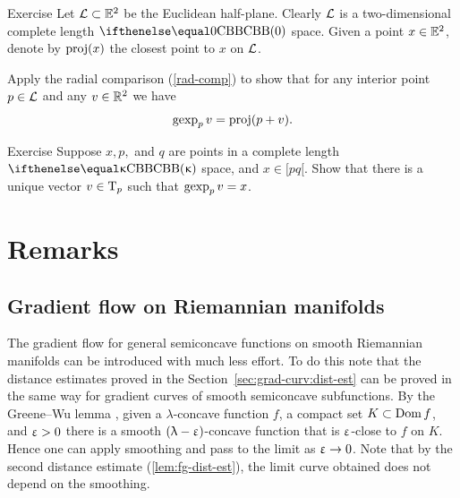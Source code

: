 \begin{thm}{Exercise}\label{ex:gexp} 
Let $\spc{L}\subset\EE^2$ be the Euclidean half-plane. 
Clearly $\mathcal{L}$ is a two-dimensional complete length $\Alex{0}$ space.
Given a point $x\in \EE^2$, denote by $\mathop{\rm proj}\nolimits(x)$ the closest point to $x$ on $\mathcal{L}$. 

Apply the radial comparison (\ref{rad-comp}) to show that for any interior point $p\in \spc{L}$ and any $v\in\R^2$  we have 
\[\mathop{\rm gexp}\nolimits_p v=\mathop{\rm proj}\nolimits(p+v).\]
\end{thm}

\begin{thm}{Exercise}\label{ex:inv-gexp}
Suppose $x,p,$ and $q$ are points in a complete length $\Alex\kappa$ space, and $x\in [pq[$.
Show that there is a unique vector $v\in\T_p$ such that $\mathop{\rm gexp}\nolimits_p v=x$.
\end{thm}

%


\section{Remarks}

\subsection*{Gradient flow on Riemannian manifolds}
The gradient flow for general semiconcave functions 
on smooth Riemannian manifolds  can be introduced with much less effort.
To do this note that the distance estimates proved in the Section~\ref{sec:grad-curv:dist-est}
can be proved in the same way for gradient curves of smooth semiconcave subfunctions.
By the Greene--Wu lemma \cite{greene-wu}, 
given 
a $\lambda$-concave function $f$, 
a compact set $K\subset \Dom f$,
and $\upvarepsilon>0$
there is a smooth $(\uplambda-\upvarepsilon)$-concave function that is 
$\upvarepsilon$-close to $f$ on $K$.
Hence one can apply smoothing and pass to the limit as $\eps\to0$.
Note that by the second distance  estimate (\ref{lem:fg-dist-est}), the  limit curve obtained does not depend on the smoothing.

